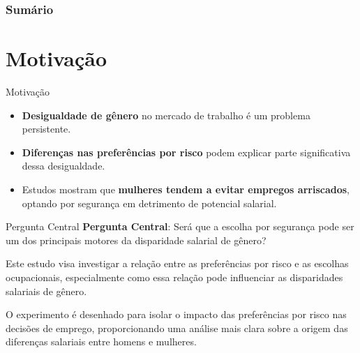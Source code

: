 \documentclass[aspectratio=169, xcolor={dvipsnames}, 10pt, brazil]{beamer}
\begin{document}
\begin{frame}[t]
    \frametitle{Sumário}
    \scriptsize
    \tableofcontents
\end{frame}

\section{Motivação}
\begin{frame}{Motivação}
    \begin{itemize}
        \item \textbf{Desigualdade de gênero} no mercado de trabalho é um problema persistente.
        \item \textbf{Diferenças nas preferências por risco} podem explicar parte significativa dessa desigualdade.
        \item Estudos mostram que \textbf{mulheres tendem a evitar empregos arriscados}, optando por segurança em detrimento de potencial salarial.
    \end{itemize}
\end{frame}

\begin{frame}{Pergunta Central}
    \textbf{Pergunta Central}: Será que a escolha por segurança pode ser um dos principais motores da disparidade salarial de gênero?

    \vspace{0.5cm}

    Este estudo visa investigar a relação entre as preferências por risco e as escolhas ocupacionais, especialmente como essa relação pode influenciar as disparidades salariais de gênero.

    \vspace{0.5cm}

    O experimento é desenhado para isolar o impacto das preferências por risco nas decisões de emprego, proporcionando uma análise mais clara sobre a origem das diferenças salariais entre homens e mulheres.
\end{frame}

\end{document}

